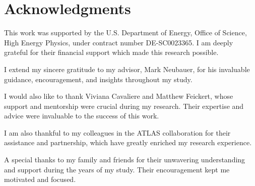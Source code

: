 \chapter*{Acknowledgments}
This work was supported by the U.S. Department of Energy, Office of Science, High Energy Physics, under contract number DE-SC0023365. I am deeply grateful for their financial support which made this research possible.

I extend my sincere gratitude to my advisor, Mark Neubauer, for his invaluable guidance, encouragement, and insights throughout my study.

I would also like to thank Viviana Cavaliere and Matthew Feickert, whose support and mentorship were crucial during my research. Their expertise and advice were invaluable to the success of this work.

I am also thankful to my colleagues in the ATLAS collaboration for their assistance and partnership, which have greatly enriched my research experience.

A special thanks to my family and friends for their unwavering understanding and support during the years of my study. Their encouragement kept me motivated and focused.



